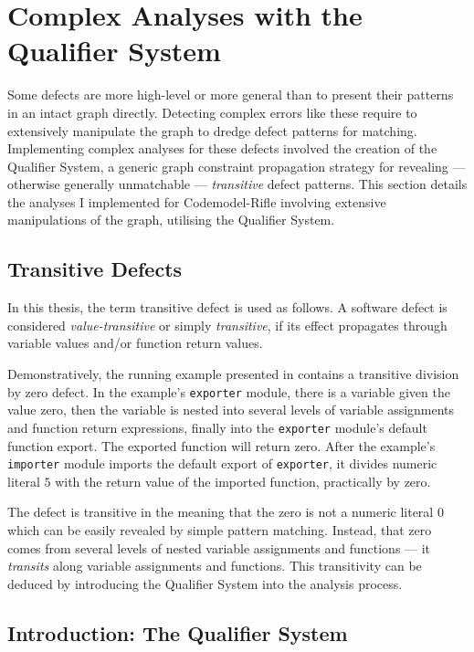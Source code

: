 \section{Complex Analyses with the Qualifier System}

Some defects are more high-level or more general than to present their patterns in an intact graph directly. Detecting complex errors like these require to extensively manipulate the graph to dredge defect patterns for matching. Implementing complex analyses for these defects involved the creation of the Qualifier System, a generic graph constraint propagation strategy for revealing — otherwise generally unmatchable — \emph{transitive} defect patterns. This section details the analyses I implemented for Codemodel-Rifle involving extensive manipulations of the graph, utilising the Qualifier System.


\subsection{Transitive Defects}

In this thesis, the term transitive defect is used as follows. A software defect is considered \emph{value-transitive} or simply \emph{transitive}, if its effect propagates through variable values and/or function return values.

Demonstratively, the running example presented in  contains a transitive division by zero defect. In the example's \lstinline{exporter} module, there is a variable given the value zero, then the variable is nested into several levels of variable assignments and function return expressions, finally into the \lstinline{exporter} module's default function export. The exported function will return zero. After the example's \lstinline{importer} module imports the default export of \lstinline{exporter}, it divides numeric literal $5$ with the return value of the imported function, practically by zero.

The defect is transitive in the meaning that the zero is not a numeric literal $0$ which can be easily revealed by simple pattern matching. Instead, that zero comes from several levels of nested variable assignments and functions — it \emph{transits} along variable assignments and functions. This transitivity can be deduced by introducing the Qualifier System into the analysis process.


\subsection{Introduction: The Qualifier System}

